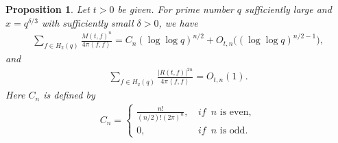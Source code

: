 \documentclass[11pt,reqno]{amsart}
\newcommand{\bna}{\begin{eqnarray*}}
\newcommand{\ena}{\end{eqnarray*}}
\numberwithin{equation}{section}
\theoremstyle{plain}
\newtheorem{proposition}[lemma]{Proposition}
\theoremstyle{definition}
\begin{document}
\begin{proposition}\label{main propsition}
Let $t>0$ be given. For prime number $q$ sufficiently large and $x=q^{\delta/3}$ with sufficiently small $\delta>0$, we have
\begin{equation}\label{M(t,f) moment}
\begin{split}
\sum_{f\in H_2(q)}\frac{M(t,f)^n}{4\pi \left<f,f\right>}=C_n(\log\log q)^{n/2}+O_{t,n}\big((\log\log q)^{n/2-1}\big),
\end{split}
\end{equation}
and
\begin{equation}\label{R(t,f) moment}
\begin{split}
\sum_{f\in H_2(q)}\frac{|R(t,f)|^{2n}}{4\pi \left<f,f\right>}=O_{t,n}(1).
\end{split}
\end{equation}
Here $C_n$ is defined by
\bna
C_n=\begin{cases}
\frac{n!}{(n/2)!(2\pi)^{n}}, \,&\textit{if }\, n\,\, \text{is even},\\
0, \,& \textit{if }\, n \,\,\text{is odd}.
\end{cases}
\ena
\end{proposition}
\end{document}
